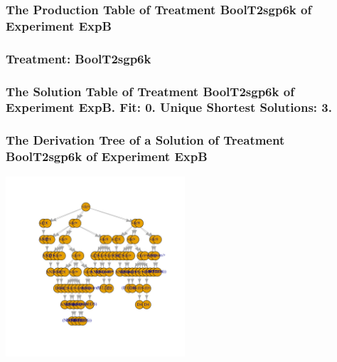 \documentclass[18pt,c]{beamer}
\begin{document}
 \begin{frame}
 \fontsize{8pt}{9pt}\selectfont
 \frametitle{ The Production Table of Treatment BoolT2sgp6k of Experiment ExpB }

 \label{ExpBGrammarTable017.tex}  
 \end{frame}

 \begin{frame}
 \fontsize{8pt}{9pt}\selectfont
 \frametitle{ Treatment: BoolT2sgp6k }

 \label{ExpBStatsTable021.tex}  
 \end{frame}

 \begin{frame}
 \fontsize{8pt}{9pt}\selectfont
 \frametitle{ The Solution Table of Treatment BoolT2sgp6k of Experiment ExpB. Fit: 0. Unique Shortest Solutions: 3. }

 \label{ExpBSolutionTable014.tex}  
 \end{frame}

 \begin{frame}
 \frametitle{ The Derivation Tree of a Solution of Treatment BoolT2sgp6k of Experiment ExpB }
 \begin{center}
\includegraphics[width=0.5\textwidth, angle=0]
{ExpBDerivationTreeFigure014.pdf}
 \end{center}
 \label{report/ExpBDerivationTreeFigure014.pdf}  
 \end{frame}
\end{document}
